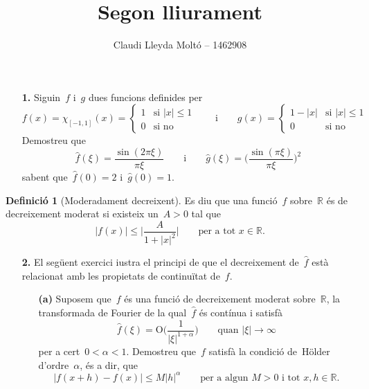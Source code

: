 \documentclass[a4paper]{article}
\title{Segon lliurament}
\author{Claudi Lleyda Moltó -- 1462908}
\theoremstyle{definition}
\newtheorem{definition}{Definició}
\newcommand{\uppi}{\pi}
\newcommand{\abs}[1]{\lvert{#1}\rvert}
\begin{document}
\maketitle

\begin{enumerate}
    \item[\textbf{1.}] Siguin~\(f\) i~\(g\) dues funcions definides per
        \[
            f(x) = \chi_{[-1,1]}(x) = \begin{cases}
                1 & \text{si } \abs{x} \leq 1 \\
                0 & \text{si no}
            \end{cases}
            \qquad\text{i}\qquad
            g(x) = \begin{cases}
                1 - \abs{x} & \text{si } \abs{x} \leq 1 \\
                0 & \text{si no}
            \end{cases}
        \]
        Demostreu que
        \[
            \widehat{f}(\xi) = \frac{\sin(2\uppi\xi)}{\uppi\xi}
            \qquad\text{i}\qquad
            \widehat{g}(\xi) = \biggl(\frac{\sin(\uppi\xi)}{\uppi\xi}\biggr)^{2}
        \]
        sabent que~\(\widehat{f}(0) = 2\) i~\(\widehat{g}(0) = 1\).
\end{enumerate}

\begin{definition}[Moderadament decreixent]
    Es diu que una funció~\(f\) sobre~\(\mathbb{R}\) és de decreixement moderat
    si existeix un~\(A>0\) tal que
    \[
        \abs{f(x)} \leq \abs{\frac{A}{1+\abs{x}^{2}}}
        \qquad\text{per a tot }x\in\mathbb{R}.
    \]
\end{definition}

\begin{enumerate}
    \item[\textbf{2.}] El següent exercici i{\lgem}ustra el principi de que el
        decreixement de~\(\widehat{f}\) està relacionat amb les propietats de
        continuïtat de~\(f\).
        \begin{enumerate}
            \item[\textbf{(a)}] Suposem que~\(f\) és una funció de decreixement
                moderat sobre~\(\mathbb{R}\), la transformada de Fourier de la
                qual~\(\widehat{f}\) és contínua i satisfà
                \[
                    \widehat{f}(\xi) =
                    \mathrm{O}\biggl(\frac{1}{\abs{\xi}^{1+\alpha}}\biggr)
                    \qquad\text{quan } \abs{\xi}\to\infty
                \]
                per a cert~\(0<\alpha<1\). Demostreu que~\(f\) satisfà la
                condició de~H\"older d'ordre~\(\alpha\), és a dir, que
                \[
                    \abs{f(x+h)-f(x)} \leq M\abs{h}^{\alpha}
                    \qquad
                    \text{per a algun } M>0 \text{ i tot } x,h\in\mathbb{R}.
                \]
        \end{enumerate}
\end{enumerate}
\end{document}
